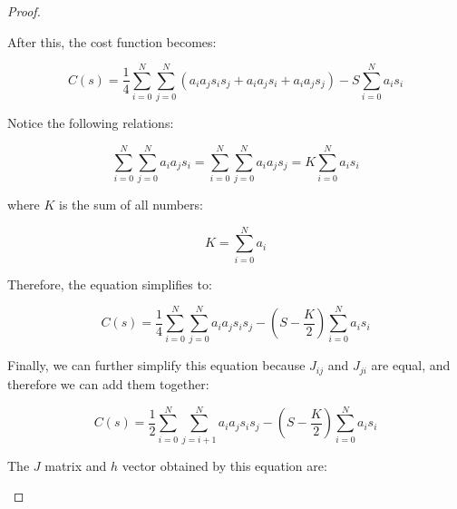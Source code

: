 \documentclass[12pt,a4paper]{report}
\begin{document}
\begin{proof}
\begin{center}
After this, the cost function becomes:
\end{center}

\[ C(s) = \frac{1}{4} \sum_{i=0}^{N} \sum_{j=0}^{N} (a_i a_j s_i s_j + a_i a_j s_i + a_i a_j s_j) - S \sum_{i=0}^{N} a_i s_i \]

\begin{center}
Notice the following relations:
\end{center}

\[ \sum_{i=0}^{N} \sum_{j=0}^{N} a_i a_j s_i = \sum_{i=0}^{N} \sum_{j=0}^{N} a_i a_j s_j = K \sum_{i=0}^{N} a_i s_i \]

\begin{center}
where \( K \) is the sum of all numbers:
\end{center}

\[ K = \sum_{i=0}^{N} a_i \]

\begin{center}
Therefore, the equation simplifies to:
\end{center}

\[ C(s) = \frac{1}{4} \sum_{i=0}^{N} \sum_{j=0}^{N} a_i a_j s_i s_j - (S - \frac{K}{2}) \sum_{i=0}^{N} a_i s_i \]

\begin{center}
Finally, we can further simplify this equation because \( J_{ij} \) and \( J_{ji} \) are equal, and therefore we can add them together:
\end{center}

\[ C(s) = \frac{1}{2} \sum_{i=0}^{N} \sum_{j=i+1}^{N} a_i a_j s_i s_j - (S - \frac{K}{2}) \sum_{i=0}^{N} a_i s_i \]

\begin{center}
The \( J \) matrix and \( h \) vector obtained by this equation are:
\end{center}

\begin{center}
\end{center}

\end{proof}

\newpage
\end{document}

